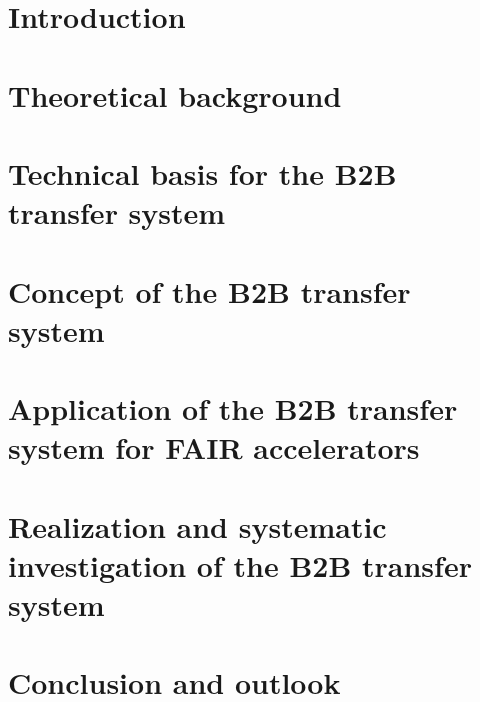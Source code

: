 \documentclass[12pt,twoside]{report}
\begin{document}



\chapter{Introduction}

\chapter{Theoretical background}

%
\chapter{Technical basis for the B2B transfer system}

\chapter{Concept of the B2B transfer system}

\chapter{Application of the B2B transfer system for FAIR accelerators}

\chapter{Realization and systematic investigation of the B2B transfer system}

%
\chapter{Conclusion and outlook}

\end{document}
